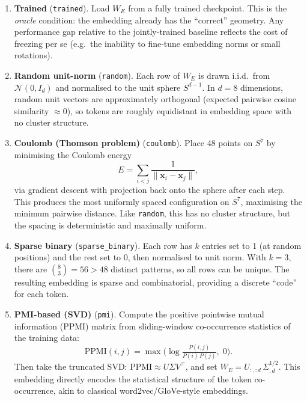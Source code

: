 \documentclass[11pt]{article}
\begin{document}
\begin{enumerate}
  \item \textbf{Trained} (\texttt{trained}).
    Load $W_E$ from a fully trained checkpoint.  This is the
    \emph{oracle} condition: the embedding already has the ``correct''
    geometry.  Any performance gap relative to the jointly-trained
    baseline reflects the cost of freezing per se (e.g.\ the inability
    to fine-tune embedding norms or small rotations).

  \item \textbf{Random unit-norm} (\texttt{random}).
    Each row of $W_E$ is drawn i.i.d.\ from $\mathcal{N}(0, I_d)$ and
    normalised to the unit sphere $S^{d-1}$.  In $d = 8$ dimensions,
    random unit vectors are approximately orthogonal (expected pairwise
    cosine similarity $\approx 0$), so tokens are roughly equidistant in
    embedding space with no cluster structure.

  \item \textbf{Coulomb (Thomson problem)} (\texttt{coulomb}).
    Place 48 points on $S^7$ by minimising the Coulomb energy
    \begin{equation}
      E = \sum_{i < j} \frac{1}{\|\mathbf{x}_i - \mathbf{x}_j\|},
    \end{equation}
    via gradient descent with projection back onto the sphere after each
    step.  This produces the most uniformly spaced configuration on
    $S^7$, maximising the minimum pairwise distance.  Like \texttt{random},
    this has no cluster structure, but the spacing is deterministic and
    maximally uniform.

  \item \textbf{Sparse binary} (\texttt{sparse\_binary}).
    Each row has $k$ entries set to 1 (at random positions) and the rest
    set to 0, then normalised to unit norm.  With $k = 3$, there are
    $\binom{8}{3} = 56 > 48$ distinct patterns, so all rows can be
    unique.  The resulting embedding is sparse and combinatorial,
    providing a discrete ``code'' for each token.

  \item \textbf{PMI-based (SVD)} (\texttt{pmi}).
    Compute the positive pointwise mutual information (PPMI) matrix from
    sliding-window co-occurrence statistics of the training data:
    \begin{equation}
      \mathrm{PPMI}(i, j) = \max\!\bigl(
        \log \tfrac{P(i,j)}{P(i)\,P(j)},\; 0
      \bigr).
    \end{equation}
    Then take the truncated SVD:
    $\mathrm{PPMI} \approx U \Sigma V^\top$, and set
    $W_E = U_{:,:d} \,\Sigma_{:d}^{1/2}$.
    This embedding directly encodes the statistical structure of the
    token co-occurrence, akin to classical word2vec/GloVe-style
    embeddings.
\end{enumerate}
\end{document}
